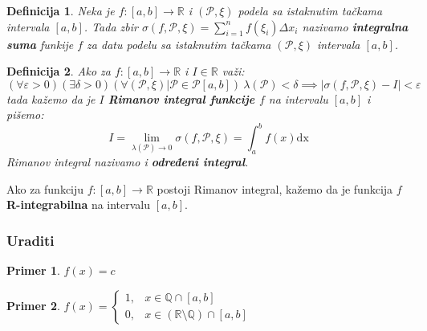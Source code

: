 \documentclass{article}
\newtheorem{definicija}{Definicija}[section]
\newtheorem{prim}{Primer}[section]
\begin{document}
\begin{defbox}
    \begin{definicija}
        Neka je $f:[a,b]\longrightarrow\mathbb{R}$ i $(\mathcal{P},\xi)$ podela sa istaknutim tačkama intervala $[a,b]$. Tada zbir
        $\displaystyle\sigma(f,\mathcal{P},\xi)=\sum_{i=1}^{n}f(\xi_i)\varDelta x_i$ nazivamo \textbf{integralna suma} funkije $f$ za datu podelu
        sa istaknutim tačkama $(\mathcal{P},\xi)$ intervala $[a,b]$.
    \end{definicija}
\end{defbox}
\begin{defbox}
    \label{definicija_2.3}
    \begin{definicija}
        Ako za $f: [a,b]\longrightarrow\mathbb{R}$ i $I\in\mathbb{R}$ važi:
        $$(\forall\varepsilon>0)(\exists\delta>0)(\forall(\mathcal{P},\xi)\big|\mathcal{P}\in\mathcal{P}[a,b])\ \lambda(\mathcal{P})<\delta\implies|\sigma(f,\mathcal{P},\xi)-I|<\varepsilon$$
        tada kažemo da je $I$ \textbf{Rimanov integral funkcije $f$} na intervalu $[a,b]$ i pišemo:
        $$I=\lim_{\lambda(\mathcal{P})\rightarrow 0}\sigma(f,\mathcal{P},\xi)=\int_{a}^{b}f(x)\text{dx}$$
        Rimanov integral nazivamo i \textbf{određeni integral}.
    \end{definicija}
\end{defbox}
Ako za funkciju $f:[a,b]\longrightarrow\mathbb{R}$ postoji Rimanov integral, kažemo da je funkcija $f$ \textbf{R-integrabilna} na intervalu $[a,b]$.
\subsubsection{Uraditi}
\begin{primbox}
    \begin{prim}
        $f(x)=c$
    \end{prim}
\end{primbox}
\begin{primbox}
    \begin{prim}
        $f(x)=
            \begin{cases}
                1, & x \in \mathbb{Q} \cap [a,b]                        \\
                0, & x \in (\mathbb{R} \setminus \mathbb{Q}) \cap [a,b]
            \end{cases}$
    \end{prim}
\end{primbox}
\end{document}
